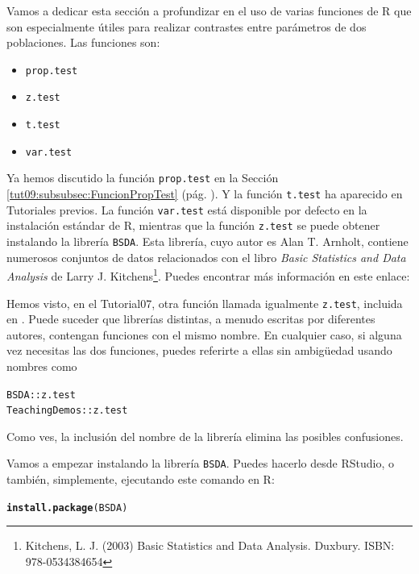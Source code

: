 \documentclass[10pt,a4paper]{article}\usepackage[]{graphicx}\usepackage[]{color}
\makeatletter
\newcommand{\hlopt}[1]{\textcolor[rgb]{0,0,0}{#1}}%
\newcommand{\hlstd}[1]{\textcolor[rgb]{0.345,0.345,0.345}{#1}}%
\newcommand{\hlkwd}[1]{\textcolor[rgb]{0.737,0.353,0.396}{\textbf{#1}}}%
\newenvironment{kframe}{%
 \def\at@end@of@kframe{}%
 \ifinner\ifhmode%
  \def\at@end@of@kframe{\end{minipage}}%
  \begin{minipage}{\columnwidth}%
 \fi\fi%
 \def\FrameCommand##1{\hskip\@totalleftmargin \hskip-\fboxsep
 \colorbox{shadecolor}{##1}\hskip-\fboxsep
     \hskip-\linewidth \hskip-\@totalleftmargin \hskip\columnwidth}%
 \MakeFramed {\advance\hsize-\width
   \@totalleftmargin\z@ \linewidth\hsize
   \@setminipage}}%
 {\par\unskip\endMakeFramed%
 \at@end@of@kframe}
\newenvironment{knitrout}{}{} %
\newcounter {cont01}
\makeatother
\begin{document}
Vamos a dedicar esta sección a profundizar en el uso de varias funciones de R que son especialmente útiles para realizar contrastes entre parámetros de dos poblaciones. Las funciones son:
\begin{itemize}
  \item {\tt prop.test}
  \item {\tt z.test}
  \item {\tt t.test}
  \item {\tt var.test}
\end{itemize}
Ya hemos discutido la función {\tt prop.test} en la Sección \ref{tut09:subsubsec:FuncionPropTest} (pág. \pageref{tut09:subsubsec:FuncionPropTest}). Y la función {\tt t.test} ha aparecido en Tutoriales previos. La función {\tt var.test} está disponible por defecto en la instalación estándar de R, mientras que la función {\tt z.test} se puede obtener instalando la librería {\tt BSDA}. Esta librería, cuyo autor es Alan T. Arnholt, contiene numerosos conjuntos de datos relacionados con el libro {\em Basic Statistics and Data Analysis} de Larry J. Kitchens\footnote{Kitchens, L. J. (2003)
Basic Statistics and Data Analysis. Duxbury. ISBN: 978-0534384654}. Puedes encontrar más información en este enlace:
\begin{center}
\end{center}
Hemos visto, en el Tutorial07, otra función llamada igualmente {\tt z.test}, incluida en . Puede suceder que librerías distintas, a menudo escritas por diferentes autores, contengan funciones con el mismo nombre. En cualquier caso, si alguna vez necesitas las dos funciones, puedes referirte a ellas sin ambigüedad usando nombres como
\begin{knitrout}
\color{fgcolor}\begin{kframe}
\begin{alltt}
\hlstd{BSDA}\hlopt{::}\hlstd{z.test}
\hlstd{TeachingDemos}\hlopt{::}\hlstd{z.test}
\end{alltt}
\end{kframe}
\end{knitrout}
Como ves, la inclusión del nombre de la librería elimina las posibles confusiones.

Vamos a empezar  instalando la librería {\tt BSDA}. Puedes hacerlo desde RStudio, o también, simplemente, ejecutando este comando en R:
\begin{knitrout}
\color{fgcolor}\begin{kframe}
\begin{alltt}
\hlkwd{install.package}\hlstd{(BSDA)}
\end{alltt}
\end{kframe}
\end{knitrout}
\end{document}
